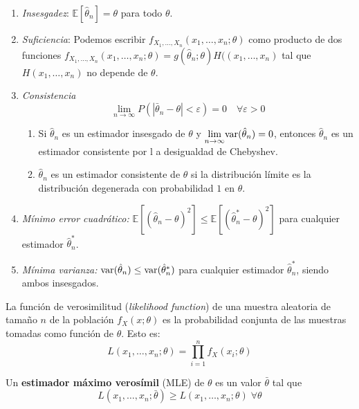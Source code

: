 	\begin{enumerate}
	\item \textit{Insesgadez}: 
			$\mathbb{E}[\hat{\theta}_n] = \theta$ para todo $\theta$.
	\item \textit{Suficiencia}: Podemos escribir
			$f_{X_1, \dots, X_n}(x_1, \dots, x_n; \theta)$ 
			como producto de dos funciones $f_{X_1, \dots, 
			X_n}(x_1, \dots, x_n; \theta) = g(\hat{\theta}_n; 
			\theta) H((x_1, \dots, x_n)$ tal que $H(x_1, 
			\dots, x_n)$ no depende de $\theta$.
	\item \textit{Consistencia}
		\[ 
			\lim_{n \rightarrow \infty} 
				P(|\bar{\theta}_n - \theta| < \varepsilon) =
				 0 \quad 
				 \forall \varepsilon > 0 
		\]
	\begin{enumerate}
		\item Si $\hat{\theta}_n$ es un estimador insesgado 
			de $\theta$ y $\underset{n \rightarrow \infty}
			{\lim} \text{var}(\hat{\theta}_n) = 0$, entonces $
			\hat{\theta}_n$ es un estimador consistente por l
			a desigualdad de Chebyshev.
		\item $\hat{\theta}_n$ es un estimador consistente de 
			$\theta$ si la distribución límite es la 
			distribución degenerada con probabilidad $1$ en 
			$\theta$.
	\end{enumerate}
			
	\item \textit{Mínimo error cuadrático:} 	
			$\mathbb{E}[(\hat{\theta}_n - \theta)^2] \leq
			 \mathbb{E}[(\hat{\theta}_n^* - \theta)^2]$ para cualquier 
			 estimador $\hat{\theta}_n^*$.
	\item \textit{Mínima varianza:} $\text{var}(\hat{\theta}_n)
			\leq \text{var}(\hat{\theta}^*_n)$ para cualquier 
			estimador $\hat{\theta}_n^*$, siendo ambos
			insesgados.
	\end{enumerate}
	
\begin{definicion}
	La función de verosimilitud (\textit{likelihood 
function}) de una muestra aleatoria de tamaño $n$ de la 
población $f_X(x;\theta)$ es la probabilidad conjunta de las 
muestras tomadas como función de $\theta$. Esto es:
	\[ L(x_1, \dots, x_n; \theta) = 
		\prod\limits_{i=1}^n f_X(x_i;\theta)	\]
\end{definicion}

	Un \textbf{estimador máximo verosímil} (MLE) de $\theta$ 
es un valor $\bar{\theta}$ tal que 
	\[ 
		L(x_1, \dots, x_n; \bar{\theta}) \geq 
			L(x_1, \dots, x_n; \theta) \; \forall \theta 	
	\]
	
